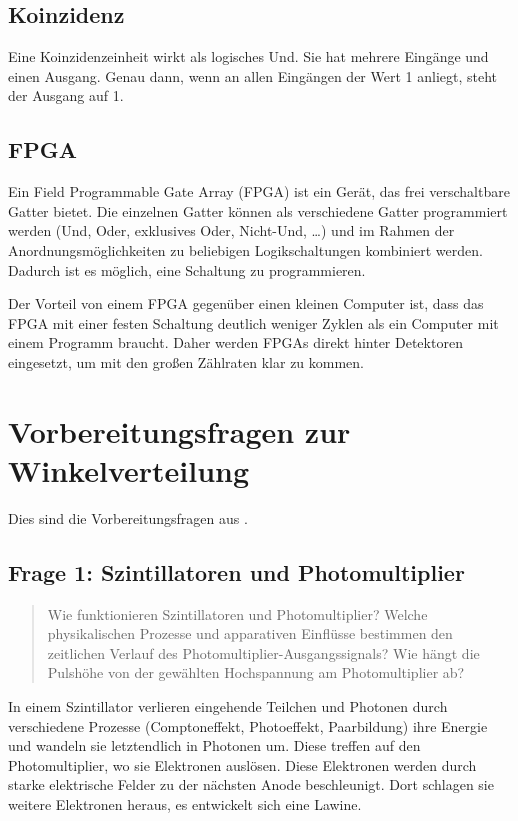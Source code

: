 \documentclass[11pt, ngerman, fleqn, DIV=15, headinclude, BCOR=2cm]{scrreprt}
\begin{document}
\parencite{Ueding/525}

\subsection{Koinzidenz}

Eine Koinzidenzeinheit wirkt als logisches Und. Sie hat mehrere Eingänge und
einen Ausgang. Genau dann, wenn an allen Eingängen der Wert 1 anliegt, steht
der Ausgang auf 1.

\subsection{FPGA}

Ein Field Programmable Gate Array (FPGA) ist ein Gerät, das frei verschaltbare
Gatter bietet. Die einzelnen Gatter können als verschiedene Gatter programmiert
werden (Und, Oder, exklusives Oder, Nicht-Und, …) und im Rahmen der
Anordnungsmöglichkeiten zu beliebigen Logikschaltungen kombiniert werden.
Dadurch ist es möglich, eine Schaltung zu programmieren.

Der Vorteil von einem FPGA gegenüber einen kleinen Computer ist, dass das FPGA
mit einer festen Schaltung deutlich weniger Zyklen als ein Computer mit einem
Programm braucht. Daher werden FPGAs direkt hinter Detektoren eingesetzt, um
mit den großen Zählraten klar zu kommen.

\section{Vorbereitungsfragen zur Winkelverteilung}

Dies sind die Vorbereitungsfragen aus \parencite[11]{physik512-Anleitung}.

\subsection{Frage 1: Szintillatoren und Photomultiplier}
\label{sec:frage1-1}

\begin{quote}
    Wie funktionieren Szintillatoren und Photomultiplier? Welche
    physikalischen Prozesse und apparativen Einflüsse bestimmen den
    zeitlichen Verlauf des Photomultiplier-Ausgangssignals? Wie hängt die
    Pulshöhe von der gewählten Hochspannung am Photomultiplier ab?
\end{quote}

In einem Szintillator verlieren eingehende Teilchen und Photonen durch
verschiedene Prozesse (Comptoneffekt, Photoeffekt, Paarbildung) ihre Energie
und wandeln sie letztendlich in Photonen um. Diese treffen auf den
Photomultiplier, wo sie Elektronen auslösen. Diese Elektronen werden durch
starke elektrische Felder zu der nächsten Anode beschleunigt. Dort schlagen sie
weitere Elektronen heraus, es entwickelt sich eine Lawine.
\end{document}
